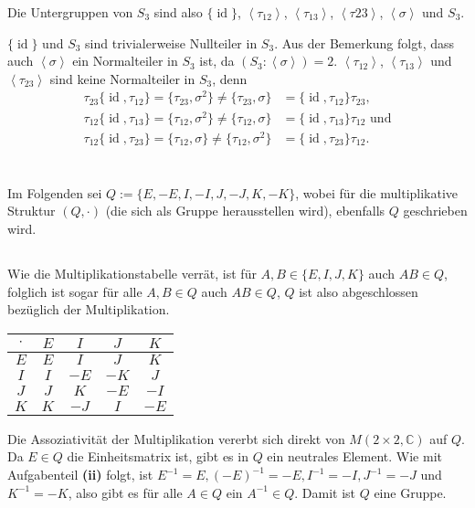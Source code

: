 \documentclass[a4paper,10pt]{article}
\theoremstyle{definition}
\newcommand{\C}{\mathbb{C}}
\newcommand{\id}{\operatorname{id}}
\newcommand{\gen}[1]{\left\langle#1\right\rangle}
\begin{document}
Die Untergruppen von $S_3$ sind also $\{\id\}$, $\gen{\tau_{12}}$, $\gen{\tau_{13}}$, $\gen{\tau{23}}$, $\gen{\sigma}$ und $S_3$.

$\{\id\}$ und $S_3$ sind trivialerweise Nullteiler in $S_3$. Aus der Bemerkung folgt, dass auch $\gen{\sigma}$ ein Normalteiler in $S_3$ ist, da $(S_3 : \gen{\sigma}) = 2$. $\gen{\tau_{12}}$, $\gen{\tau_{13}}$ und $\gen{\tau_{23}}$ sind keine Normalteiler in $S_3$, denn
\begin{align*}
 \tau_{23} \{ \id, \tau_{12}\}
 = \{ \tau_{23}, \sigma^2 \}
 \neq \{ \tau_{23}, \sigma \}
 &= \{\id, \tau_{12}\} \tau_{23},\\
 \tau_{12} \{ \id, \tau_{13}\}
 = \{ \tau_{12}, \sigma^2 \}
 \neq \{ \tau_{12}, \sigma \}
 &= \{ \id, \tau_{13} \} \tau_{12} \text{ und}\\
 \tau_{12} \{ \id, \tau_{23} \}
 = \{ \tau_{12}, \sigma \}
 \neq  \{ \tau_{12}, \sigma^2 \}
 &= \{ \id, \tau_{23} \} \tau_{12}.
\end{align*}





\section{}
Im Folgenden sei $Q := \{E,-E,I,-I,J,-J,K,-K\}$, wobei für die multiplikative Struktur $(Q,\cdot)$ (die sich als Gruppe herausstellen wird), ebenfalls $Q$ geschrieben wird.

\subsection{}
Wie die Multiplikationstabelle verrät, ist für $A,B \in \{E, I, J, K\}$ auch $AB \in Q$, folglich ist sogar für alle $A,B \in Q$ auch $AB \in Q$, $Q$ ist also abgeschlossen bezüglich der Multiplikation.
\begin{center}
 \begin{tabular}{c|cccc} 
  $\cdot$ & $E$ & $ I$ & $ J$ & $ K$  \\\hline 
      $E$ & $E$ & $ I$ & $ J$ & $ K$  \\ 
      $I$ & $I$ & $-E$ & $-K$ & $ J$  \\
      $J$ & $J$ & $ K$ & $-E$ & $-I$ \\
      $K$ & $K$ & $-J$ & $ I$ & $-E$
 \end{tabular}
\end{center}
Die Assoziativität der Multiplikation vererbt sich direkt von $M(2 \times 2, \C)$ auf $Q$.
Da $E \in Q$ die Einheitsmatrix ist, gibt es in $Q$ ein neutrales Element. Wie mit Aufgabenteil \textbf{(ii)} folgt, ist $E^{-1} = E, (-E)^{-1} = -E, I^{-1} = -I, J^{-1} = -J$ und $K^{-1} = -K$, also gibt es für alle $A \in Q$ ein $A^{-1} \in Q$. Damit ist $Q$ eine Gruppe.
\end{document}
